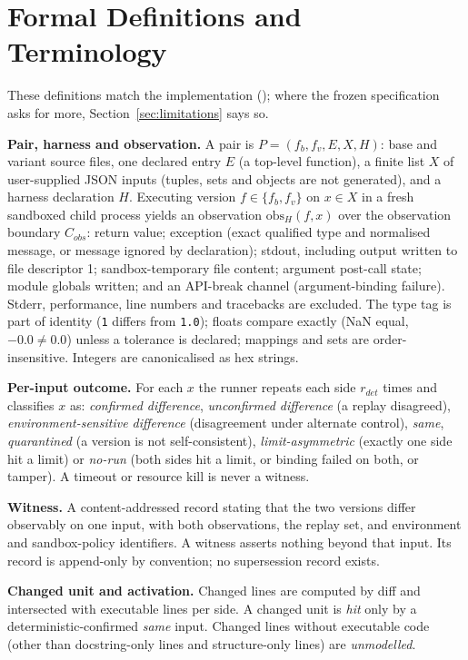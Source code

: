 \section{Formal Definitions and Terminology}\label{sec:definitions}
These definitions match the implementation (); where the frozen specification asks for more, Section~\ref{sec:limitations} says so.

\textbf{Pair, harness and observation.} A pair is $P=(f_b,f_v,E,X,H)$: base and variant source files, one declared entry $E$ (a top-level function), a finite list $X$ of user-supplied JSON inputs (tuples, sets and objects are not generated), and a harness declaration $H$. Executing version $f\in\{f_b,f_v\}$ on $x\in X$ in a fresh sandboxed child process yields an observation $\mathrm{obs}_H(f,x)$ over the observation boundary $C_{obs}$: return value; exception (exact qualified type and normalised message, or message ignored by declaration); stdout, including output written to file descriptor 1; sandbox-temporary file content; argument post-call state; module globals written; and an API-break channel (argument-binding failure). Stderr, performance, line numbers and tracebacks are excluded. The type tag is part of identity (\texttt{1} differs from \texttt{1.0}); floats compare exactly (NaN equal, $-0.0\neq 0.0$) unless a tolerance is declared; mappings and sets are order-insensitive. Integers are canonicalised as hex strings.

\textbf{Per-input outcome.} For each $x$ the runner repeats each side $r_{det}$ times and classifies $x$ as: \emph{confirmed difference}, \emph{unconfirmed difference} (a replay disagreed), \emph{environment-sensitive difference} (disagreement under alternate control), \emph{same}, \emph{quarantined} (a version is not self-consistent), \emph{limit-asymmetric} (exactly one side hit a limit) or \emph{no-run} (both sides hit a limit, or binding failed on both, or tamper). A timeout or resource kill is never a witness.

\textbf{Witness.} A content-addressed record stating that the two versions differ observably on one input, with both observations, the replay set, and environment and sandbox-policy identifiers. A witness asserts nothing beyond that input. Its record is append-only by convention; no supersession record exists.

\textbf{Changed unit and activation.} Changed lines are computed by diff and intersected with executable lines per side. A changed unit is \emph{hit} only by a deterministic-confirmed \emph{same} input. Changed lines without executable code (other than docstring-only lines and structure-only lines) are \emph{unmodelled}.

